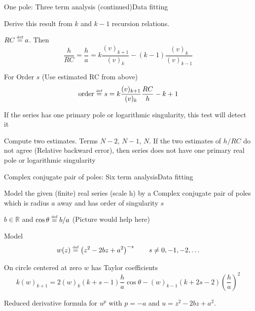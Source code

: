 \documentclass[11pt,svgnames,fleqn]{beamer}
\newcommand{\NC}[1]{{\color{red}#1}}
\newcommand{\DM}[1]{\begin{displaymath} {#1} \end{displaymath}}
\newcommand{\defeq}{\stackrel{\textup{\tiny def}}{=}}
\newcommand{\parbg}[1]{\left(  {#1} \right)}
\def\Rz{\mathbb{R}}
\newcommand{\tc}[2]{(#1)_{#2}}
\begin{document}
\begin{frame}{One pole: Three term analysis (continued)}{Data fitting}

  Derive this result from $k$ and $k-1$ recursion relations.

\vspace{2mm}

$RC \defeq a$. Then
\DM
{
  \frac{h}{RC} = \frac{h}{a} = k \frac{\tc{v}{k+1}}{\tc{v}{k}} - \parbg{k-1} \frac{\tc{v}{k}}{\tc{v}{k-1}}
}
  
  For Order $s$ (Use estimated RC from above)
\DM
{
  \text{order} \defeq s = k \frac{\tc{v}{k+1}}{\tc{v}{k}}\frac{RC}{h} - k + 1
}

  \NC{If the series has one primary pole or logarithmic singularity, this test will detect it}

  \vspace{2mm}

  Compute two estimates. Terms $N-2$, $N-1$, $N$.
  If the two estimates of $h/RC$ do not agree (Relative backward error), then series does not have
  one primary real pole or logarithmic singularity
\end{frame}

\begin{frame}{Complex conjugate pair of poles: Six term analysis}{Data fitting}

  Model the given (finite) real series (scale h) by a Complex conjugate pair of poles
  which is radius $a$ away and has order of singularity $s$

  \vspace{2mm}

  $b \in \Rz$ and $\cos \theta \defeq b/a$ (Picture would help here)

  \vspace{2mm}

  Model
  \DM
  {
    w(z) \defeq \parbg{z^2 - 2 b z + a^2}^{-s} \qquad s \neq 0, -1, -2, \ldots
  }

  \vspace{2mm}

  On circle centered at zero $w$ has Taylor coefficients 
  \DM
  {
    k \tc{w}{k+1} = 2 \tc{w}{k}\parbg{k+s-1}\frac{h}{a} \cos \theta 
    - \tc{w}{k-1}\parbg{k+2s-2}\parbg{\frac{h}{a}}^2
  }
 
  Reduced derivative formula for $u^p$ with $p=-a$ and $u=z^2 - 2 b z + a^2$.
\end{frame}
\end{document}
